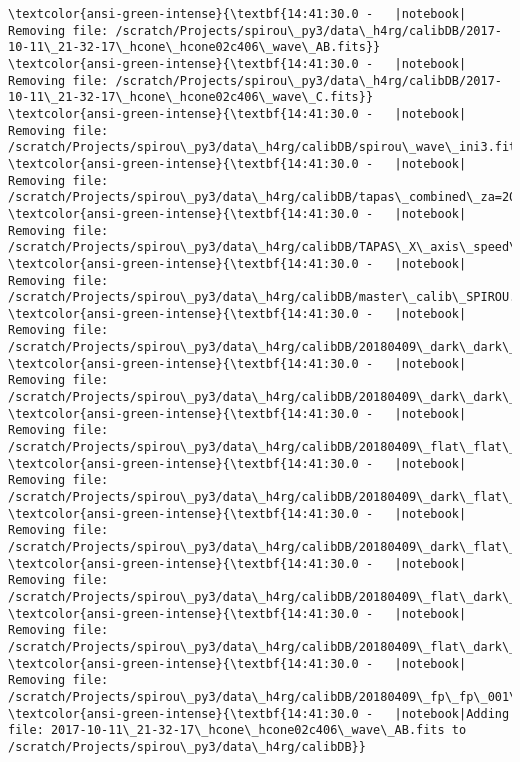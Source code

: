 \documentclass[11pt]{article}
\begin{document}
\begin{Verbatim}[commandchars=\\\{\}]
\textcolor{ansi-green-intense}{\textbf{14:41:30.0 -   |notebook|    Removing file: /scratch/Projects/spirou\_py3/data\_h4rg/calibDB/2017-10-11\_21-32-17\_hcone\_hcone02c406\_wave\_AB.fits}}
\textcolor{ansi-green-intense}{\textbf{14:41:30.0 -   |notebook|    Removing file: /scratch/Projects/spirou\_py3/data\_h4rg/calibDB/2017-10-11\_21-32-17\_hcone\_hcone02c406\_wave\_C.fits}}
\textcolor{ansi-green-intense}{\textbf{14:41:30.0 -   |notebook|    Removing file: /scratch/Projects/spirou\_py3/data\_h4rg/calibDB/spirou\_wave\_ini3.fits}}
\textcolor{ansi-green-intense}{\textbf{14:41:30.0 -   |notebook|    Removing file: /scratch/Projects/spirou\_py3/data\_h4rg/calibDB/tapas\_combined\_za=20.000000.fits}}
\textcolor{ansi-green-intense}{\textbf{14:41:30.0 -   |notebook|    Removing file: /scratch/Projects/spirou\_py3/data\_h4rg/calibDB/TAPAS\_X\_axis\_speed\_dv=0.5.fits}}
\textcolor{ansi-green-intense}{\textbf{14:41:30.0 -   |notebook|    Removing file: /scratch/Projects/spirou\_py3/data\_h4rg/calibDB/master\_calib\_SPIROU.txt}}
\textcolor{ansi-green-intense}{\textbf{14:41:30.0 -   |notebook|    Removing file: /scratch/Projects/spirou\_py3/data\_h4rg/calibDB/20180409\_dark\_dark\_001\_pp.fits}}
\textcolor{ansi-green-intense}{\textbf{14:41:30.0 -   |notebook|    Removing file: /scratch/Projects/spirou\_py3/data\_h4rg/calibDB/20180409\_dark\_dark\_001\_pp\_badpixel.fits}}
\textcolor{ansi-green-intense}{\textbf{14:41:30.0 -   |notebook|    Removing file: /scratch/Projects/spirou\_py3/data\_h4rg/calibDB/20180409\_flat\_flat\_001\_pp\_badpixel.fits}}
\textcolor{ansi-green-intense}{\textbf{14:41:30.0 -   |notebook|    Removing file: /scratch/Projects/spirou\_py3/data\_h4rg/calibDB/20180409\_dark\_flat\_001\_pp\_order\_profile\_C.fits}}
\textcolor{ansi-green-intense}{\textbf{14:41:30.0 -   |notebook|    Removing file: /scratch/Projects/spirou\_py3/data\_h4rg/calibDB/20180409\_dark\_flat\_001\_pp\_loco\_C.fits}}
\textcolor{ansi-green-intense}{\textbf{14:41:30.0 -   |notebook|    Removing file: /scratch/Projects/spirou\_py3/data\_h4rg/calibDB/20180409\_flat\_dark\_001\_pp\_order\_profile\_AB.fits}}
\textcolor{ansi-green-intense}{\textbf{14:41:30.0 -   |notebook|    Removing file: /scratch/Projects/spirou\_py3/data\_h4rg/calibDB/20180409\_flat\_dark\_001\_pp\_loco\_AB.fits}}
\textcolor{ansi-green-intense}{\textbf{14:41:30.0 -   |notebook|    Removing file: /scratch/Projects/spirou\_py3/data\_h4rg/calibDB/20180409\_fp\_fp\_001\_pp\_tilt.fits}}
\textcolor{ansi-green-intense}{\textbf{14:41:30.0 -   |notebook|Adding file: 2017-10-11\_21-32-17\_hcone\_hcone02c406\_wave\_AB.fits to /scratch/Projects/spirou\_py3/data\_h4rg/calibDB}}

\end{Verbatim}
\end{document}
